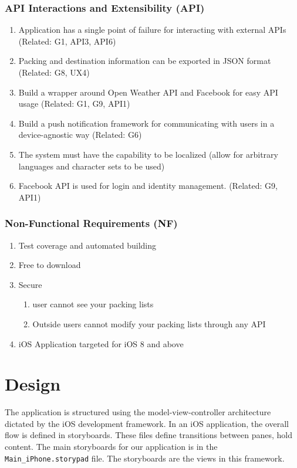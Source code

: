 \documentclass[11pt]{article}
\begin{document}
        \subsubsection{API Interactions and Extensibility (API)}
        \begin{enumerate}
        \item Application has a single point of failure for interacting with external
        APIs (Related: G1, API3, API6)
        \item Packing and destination information can be exported in JSON format
        (Related: G8, UX4)
        \item Build a wrapper around Open Weather API and Facebook for easy API
        usage (Related: G1, G9, API1)
        \item Build a push notification framework for communicating with users in
        a device-agnostic way (Related: G6)
        \item The system must have the capability to be localized (allow for arbitrary
        languages and character sets to be used)
        \item Facebook API is used for login and identity management. (Related:
        G9, API1)
        \end{enumerate}

        \subsubsection{Non-Functional Requirements (NF)}
        \begin{enumerate}
        \item Test coverage and automated building 
        \item Free to download 
        \item Secure 

        \begin{enumerate}
        \item user cannot see your packing lists 
        \item Outside users cannot modify your packing lists through any API 
        \end{enumerate}
        \item iOS Application targeted for iOS 8 and above \end{enumerate}


\section{Design}
    The application is structured using the model-view-controller architecture dictated by the iOS development framework. In an iOS application, the overall flow is defined in storyboards. These files define transitions between panes, hold content. The main storyboards for our application is in the \texttt{Main\_iPhone.storypad} file. The storyboards are the views in this framework.
\end{document}
